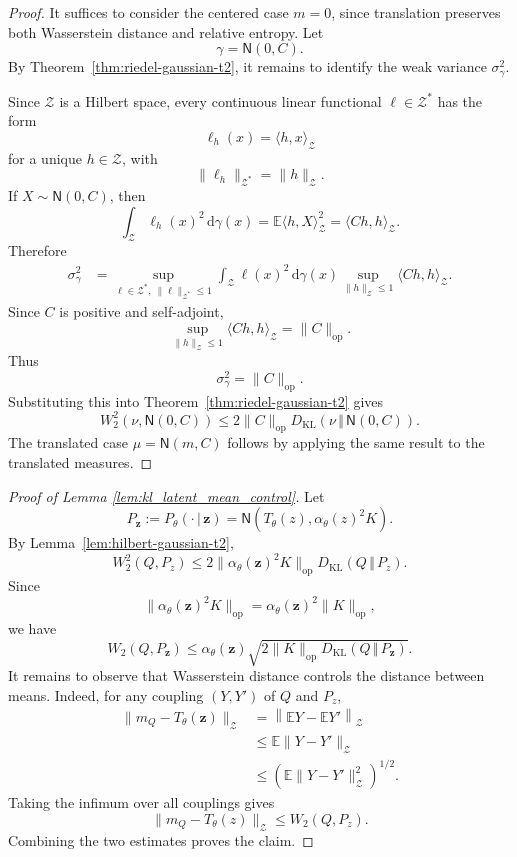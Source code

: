 \documentclass[11pt]{article}
\renewcommand{\d}{\mathrm{d}}
\begin{document}
\begin{proof}
It suffices to consider the centered case $m=0$, since translation preserves both Wasserstein distance and relative entropy. Let
\[
    \gamma=\mathsf N(0,C).
\]
By Theorem~\ref{thm:riedel-gaussian-t2}, it remains to identify the weak variance $\sigma_\gamma^2$.

Since $\mathcal Z$ is a Hilbert space, every continuous linear functional $\ell\in\mathcal Z^\ast$ has the form
\[
    \ell_h(x)=\langle h,x\rangle_{\mathcal Z}
\]
for a unique $h\in\mathcal Z$, with
\[
    \|\ell_h\|_{\mathcal Z^\ast}=\|h\|_{\mathcal Z}.
\]
If $X\sim\mathsf N(0,C)$, then
\[
    \int_{\mathcal Z}\ell_h(x)^2\,\d\gamma(x)
    =
    \mathbb E\langle h,X\rangle_{\mathcal Z}^2
    =
    \langle Ch,h\rangle_{\mathcal Z}.
\]
Therefore
\[
\begin{aligned}
    \sigma_\gamma^2
    &=
    \sup_{\ell\in\mathcal Z^\ast,\ \|\ell\|_{\mathcal Z^\ast}\le 1}
    \int_{\mathcal Z}\ell(x)^2\,\d\gamma(x)\sup_{\|h\|_{\mathcal Z}\le 1}
    \langle Ch,h\rangle_{\mathcal Z}.
\end{aligned}
\]
Since $C$ is positive and self-adjoint,
\[
    \sup_{\|h\|_{\mathcal Z}\le 1}
    \langle Ch,h\rangle_{\mathcal Z}
    =
    \|C\|_{\mathrm{op}}.
\]
Thus
\[
    \sigma_\gamma^2=\|C\|_{\mathrm{op}}.
\]
Substituting this into Theorem~\ref{thm:riedel-gaussian-t2} gives
\[
    W_2^2(\nu,\mathsf N(0,C))
    \le
    2\|C\|_{\mathrm{op}}
    D_{\mathrm{KL}}(\nu\,\Vert\,\mathsf N(0,C)).
\]
The translated case $\mu=\mathsf N(m,C)$ follows by applying the same result to the translated measures.
\end{proof}


\begin{proof}[Proof of Lemma \ref{lem:kl_latent_mean_control}]
Let
\[
    P_\mathbf{z}:=P_\theta(\cdot\,|\,\mathbf{z})
    =
    \mathsf N(T_\theta(z),\alpha_\theta(z)^2K).
\]
By Lemma~\ref{lem:hilbert-gaussian-t2},
\[
    W_2^2(Q,P_z)\le
    2\|\alpha_\theta(\mathbf{z})^2K\|_{\mathrm{op}}
    D_{\mathrm{KL}}(Q\,\Vert\,P_z).
\]
Since
\[
    \|\alpha_\theta(\mathbf{z})^2K\|_{\mathrm{op}}
    =\alpha_\theta(\mathbf{z})^2\|K\|_{\mathrm{op}},
\]
we have
\[
    W_2(Q,P_\mathbf{z})
    \le
    \alpha_\theta(\mathbf{z})
    \sqrt{
    2\|K\|_{\mathrm{op}}
    D_{\mathrm{KL}}(Q\,\Vert\,P_\mathbf{z})
    }.
\]
It remains to observe that Wasserstein distance controls the distance between means. Indeed, for
any coupling $(Y,Y')$ of $Q$ and $P_z$,
\[
\begin{aligned}
    \|m_Q-T_\theta(\mathbf{z})\|_{\mathcal Z}
    &=
    \left\|
    \mathbb E Y-\mathbb E Y'
    \right\|_{\mathcal Z}  \\
    &\le
    \mathbb E\|Y-Y'\|_{\mathcal Z}  \\
    &\le
    \left(
    \mathbb E\|Y-Y'\|_{\mathcal Z}^2
    \right)^{1/2}.
\end{aligned}
\]
Taking the infimum over all couplings gives
\[
    \|m_Q-T_\theta(z)\|_{\mathcal Z}
    \le
    W_2(Q,P_z).
\]
Combining the two estimates proves the claim.
\end{proof}
\end{document}
